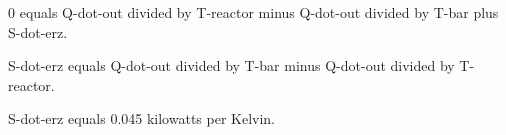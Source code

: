 0 equals Q-dot-out divided by T-reactor minus Q-dot-out divided by T-bar plus S-dot-erz.  

S-dot-erz equals Q-dot-out divided by T-bar minus Q-dot-out divided by T-reactor.  

S-dot-erz equals 0.045 kilowatts per Kelvin.